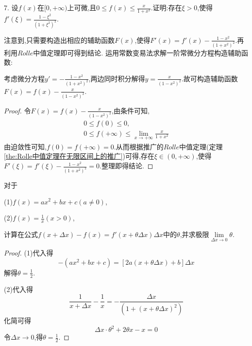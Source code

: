 \documentclass[lang=cn,newtx,10pt,scheme=chinese]{../Template/elegantbook}
\begin{document}
\begin{exercise}
7. 设\(f(x)\)在\([0,+\infty)\)上可微,且\(0\leqslant f(x)\leqslant\frac{x}{1 + x^2}\).证明:存在\(\xi>0\),使得\(f'(\xi)=\frac{1-\xi^{2}}{(1+\xi^{2})^{2}}\).
    \begin{note}
        注意到,只需要构造出相应的辅助函数$F(x)$,使得$F'(x)=f'(x)-\frac{1-x^{2}}{(1+x^{2})^{2}}$.再利用$Rolle$中值定理即可得到结论.
        运用常数变易法求解一阶常微分方程构造辅助函数:

        考虑微分方程$y'=-\frac{1-x^{2}}{(1+x^{2})^{2}}$,两边同时积分解得$y=\frac{x}{(1-x^2)^2}$.故可构造辅助函数$F(x)=f(x)-\frac{x}{(1-x^2)^2}$.
    \end{note}
    \begin{proof}
        令$F(x)=f(x)-\frac{x}{(1-x^2)^2}$,由条件可知,
        \begin{gather}
            0\le f(0)\le 0,
            \nonumber
            \\
            0\le f(+\infty)\le \lim_{x \to +\infty} \frac{x}{1+x^2} 
            \nonumber
        \end{gather}
        由迫敛性可知,$f(0)=f(+\infty)=0$.从而根据推广的$Rolle$中值定理(定理\ref{the:Rolle中值定理在无限区间上的推广})可得,存在$\xi\in(0,+\infty)$,使得$F'(\xi)=f'(\xi)-\frac{1-x^2}{(1+x^2)^2}=0$.整理即得结论.
    \end{proof}
\end{exercise}

\begin{exercise}
对于

(1)\(f(x)=ax^2 + bx + c(a\neq0)\),

(2)\(f(x)=\frac{1}{x}(x>0)\),

计算在公式\(f(x+\Delta x)-f(x)=f'(x+\theta\Delta x)\Delta x\)中的\(\theta\),并求极限\(\lim\limits_{\Delta x\to0}\theta\).
    \begin{proof}
    (1)代入得
    \begin{equation}
    [a(x+\Delta x)^2+b(x+\Delta x)+c]-(ax^2+bx+c)=[2a(x+\theta \Delta x)+b]\Delta x
        \nonumber
    \end{equation}
    解得$\theta=\frac{1}{2}$.

    (2)代入得
    \begin{equation}
    \frac{1}{x+\Delta x}-\frac{1}{x}=-\frac{\Delta x}{(1+(x+\theta \Delta x)^2)}
        \nonumber
    \end{equation}
    化简可得
    \begin{equation}
    \Delta x\cdot\theta^2+2\theta x-x=0
        \nonumber
    \end{equation}
    令$\Delta x \to 0$,得$\theta=\frac{1}{2}$.
    \end{proof}
\end{exercise}
\end{document}
